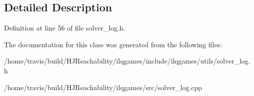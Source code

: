 \subsection{Detailed Description}


Definition at line 56 of file solver\+\_\+log.\+h.



The documentation for this class was generated from the following files\+:\begin{DoxyCompactItemize}
\item 
/home/travis/build/\+H\+J\+Reachability/ilqgames/include/ilqgames/utils/solver\+\_\+log.\+h\item 
/home/travis/build/\+H\+J\+Reachability/ilqgames/src/solver\+\_\+log.\+cpp\end{DoxyCompactItemize}
